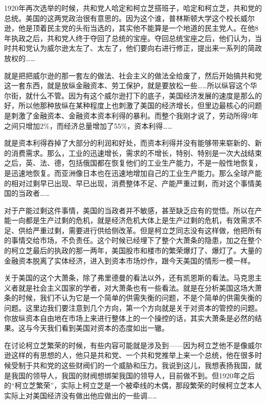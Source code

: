\documentclass[UTF8, 12pt, a4paper]{ctexrep}
\begin{document}
1920年再次选举的时候，共和党人哈定和柯立芝搭班子，哈定和柯立芝，共和党的总统。美国的这两党政治很有意思的。因为这个谁，普林斯顿大学这个校长威尔逊，他是顶着民主党的头衔当选的，其实他不能算是一个地道的民主党人。在他8年执政之后，共和党人终于夺回了总统的宝座。夺回总统宝座之后，他们认为，当时共和党认为威尔逊太左了、太左了，他们要向右进行修正，提出来一系列的简政放权的……

就是把把威尔逊的那一套左的做法、社会主义的做法全给废了，然后开始搞共和党这一套东西，就是放纵金融资本、劳工保护，就是要放松一些……所以纵容这个华尔街，就什么不管。因为有这个威尔逊打下的底子，美国经济发展的速度是那么的好，所以他那种放纵在某种程度上也刺激了美国的经济增长，但里边最核心的问题是刺激了金融资本、金融资本资本利得的暴利。而整个我刚才说了，劳动所得9年之间只增加2\%，而经济总量增加了55\%，资本利得……

就是资本利得吞掉了大部分的利润和好处，而资本利得并没有能够带来崭新的、新的消费需求。那么，工业的迅速增长，需求的不增长，特别、特别是一次大战结束之后，英、法、德，包括俄国都在恢复他们的工业生产能力，不是一般性地恢复，是迅速地恢复。而亚洲像日本也在迅速地增加自己的工业生产能力。那么全球产能的相对过剩早已出现、早已出现，消费整体不足、产能严重过剩，而对这个事情美国的当政者……

对于产能过剩这件事情，美国的当政者并不敏感，甚至缺乏应有的觉悟。所以在产能一向都是生产过剩的危机，就是经济危机大体上是生产过剩的危机，有效需求不足、供给严重过剩，需要进行供给侧改革。但是柯立芝同志没有这样做，他把所有的事情交给市场，不负责任。这个时候已经埋下了整个大萧条的隐患，加之在整个的柯立芝最后的执政的那一两年，美国股市和楼市的繁荣爆灯了、爆灯了。大量的金融资本脱离了实体经济，进入到资本市场炒作，跟今天美国的情形一模一样。

关于美国的这个大萧条，除了弗里德曼的看法以外，还有凯恩斯的看法。马克思主义者就是社会主义国家的学者，对大萧条也有一些看法。就是在分析美国这场大萧条的时候，我们不认为它是一个简单的供需失衡的问题，不是个简单的供需失衡的问题。这里边我们要注意到几个方向，第一个方向就是关于对资本的管控的问题。你放纵资本自由地在市场上来进行整体上的一个操控的话，其实大萧条是必然的结果。这与今天我们看到美国对资本的态度如出一辙。

在讨论柯立芝繁荣的时候，有些内容可能就是涉及到——因为柯立芝他不是像威尔逊这样的有思想的人，他只是共和党、一个共和党推举上来一个总统，他在很多时候受制于共和党的这些财阀们的一个威胁和压力。我说到这儿，我想表扬我国，就是我国的领导人，我国的财阀想绑架我国的领导人，目前做不到。但1920年之后的“柯立芝繁荣”，实际上柯立芝是一个被牵线的木偶，那段繁荣的时候柯立芝本人实际上对美国经济没有做出他应做出的一些调……
\end{document}
